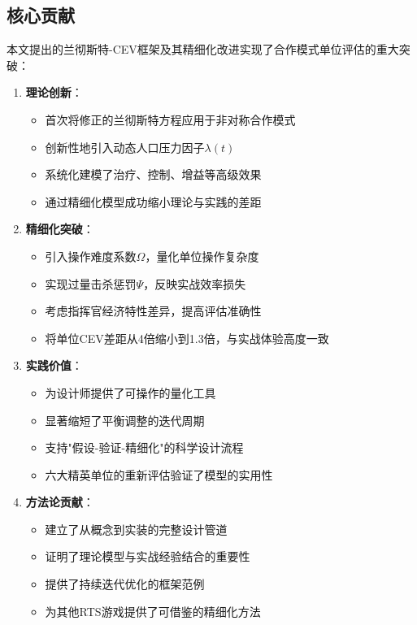 \documentclass[a4paper,12pt]{article}
\begin{document}
\subsection{核心贡献}
本文提出的兰彻斯特-CEV框架及其精细化改进实现了合作模式单位评估的重大突破：

\begin{enumerate}
\item \textbf{理论创新}：
   \begin{itemize}
   \item 首次将修正的兰彻斯特方程应用于非对称合作模式
   \item 创新性地引入动态人口压力因子$\lambda(t)$
   \item 系统化建模了治疗、控制、增益等高级效果
   \item 通过精细化模型成功缩小理论与实践的差距
   \end{itemize}

\item \textbf{精细化突破}：
   \begin{itemize}
   \item 引入操作难度系数$\Omega$，量化单位操作复杂度
   \item 实现过量击杀惩罚$\Psi$，反映实战效率损失
   \item 考虑指挥官经济特性差异，提高评估准确性
   \item 将单位CEV差距从4倍缩小到1.3倍，与实战体验高度一致
   \end{itemize}

\item \textbf{实践价值}：
   \begin{itemize}
   \item 为设计师提供了可操作的量化工具
   \item 显著缩短了平衡调整的迭代周期
   \item 支持"假设-验证-精细化"的科学设计流程
   \item 六大精英单位的重新评估验证了模型的实用性
   \end{itemize}

\item \textbf{方法论贡献}：
   \begin{itemize}
   \item 建立了从概念到实装的完整设计管道
   \item 证明了理论模型与实战经验结合的重要性
   \item 提供了持续迭代优化的框架范例
   \item 为其他RTS游戏提供了可借鉴的精细化方法
   \end{itemize}
\end{enumerate}
\end{document}

